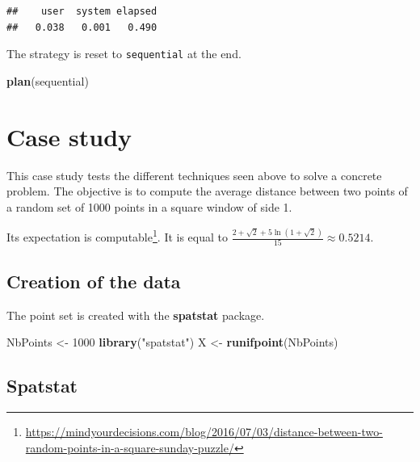 \documentclass[
  12pt,
  american,
  a4paper,
  extrafontsizes,onecolumn,openright
  ]{memoir}
\newenvironment{Shaded}{\begin{snugshade}}{\end{snugshade}}
\newcommand{\DecValTok}[1]{\textcolor[rgb]{0.00,0.00,0.81}{#1}}
\newcommand{\FunctionTok}[1]{\textcolor[rgb]{0.13,0.29,0.53}{\textbf{#1}}}
\newcommand{\NormalTok}[1]{#1}
\newcommand{\OtherTok}[1]{\textcolor[rgb]{0.56,0.35,0.01}{#1}}
\newcommand{\StringTok}[1]{\textcolor[rgb]{0.31,0.60,0.02}{#1}}
\begin{document}
\begin{verbatim}
##    user  system elapsed 
##   0.038   0.001   0.490
\end{verbatim}

\normalsize

The strategy is reset to \texttt{sequential} at the end.

\scriptsize

\begin{Shaded}
\begin{Highlighting}[]
\FunctionTok{plan}\NormalTok{(sequential)}
\end{Highlighting}
\end{Shaded}

\normalsize

\section{Case study}\label{sec:cas}

This case study tests the different techniques seen above to solve a concrete problem.
The objective is to compute the average distance between two points of a random set of 1000 points in a square window of side 1.

Its expectation is computable\footnote{\url{https://mindyourdecisions.com/blog/2016/07/03/distance-between-two-random-points-in-a-square-sunday-puzzle/}}.
It is equal to \(\frac{2+\sqrt{2}+5\ln{(1+\sqrt{2})}}{15} \approx 0.5214\).

\subsection{Creation of the data}\label{creation-of-the-data}

The point set is created with the \textbf{spatstat} package.

\scriptsize

\begin{Shaded}
\begin{Highlighting}[]
\NormalTok{NbPoints }\OtherTok{\textless{}{-}} \DecValTok{1000}
\FunctionTok{library}\NormalTok{(}\StringTok{"spatstat"}\NormalTok{)}
\NormalTok{X }\OtherTok{\textless{}{-}} \FunctionTok{runifpoint}\NormalTok{(NbPoints)}
\end{Highlighting}
\end{Shaded}

\normalsize

\subsection{Spatstat}\label{spatstat}
\end{document}
